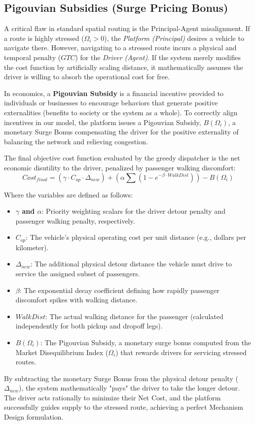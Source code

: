 \documentclass[12pt,a4paper]{article}
\begin{document}
\subsection{Pigouvian Subsidies (Surge Pricing Bonus)}
A critical flaw in standard spatial routing is the Principal-Agent misalignment. If a route is highly stressed ($\Omega_i > 0$), the \textit{Platform (Principal)} desires a vehicle to navigate there. However, navigating to a stressed route incurs a physical and temporal penalty ($GTC$) for the \textit{Driver (Agent)}. If the system merely modifies the cost function by artificially scaling distance, it mathematically assumes the driver is willing to absorb the operational cost for free.

In economics, a \textbf{Pigouvian Subsidy} is a financial incentive provided to individuals or businesses to encourage behaviors that generate positive externalities (benefits to society or the system as a whole). To correctly align incentives in our model, the platform issues a Pigouvian Subsidy, $B(\Omega_i)$, a monetary Surge Bonus compensating the driver for the positive externality of balancing the network and relieving congestion.

The final objective cost function evaluated by the greedy dispatcher is the net economic disutility to the driver, penalized by passenger walking discomfort:
\begin{equation}
    Cost_{final} = \left( \gamma \cdot C_{op} \cdot \Delta_{new} \right) + \left( \alpha \sum \left( 1 - e^{-\beta \cdot WalkDist} \right) \right) - B(\Omega_i)
\end{equation}

Where the variables are defined as follows:
\begin{itemize}
    \item \textbf{$\gamma$ and $\alpha$}: Priority weighting scalars for the driver detour penalty and passenger walking penalty, respectively.
    \item \textbf{$C_{op}$}: The vehicle's physical operating cost per unit distance (e.g., dollars per kilometer).
    \item \textbf{$\Delta_{new}$}: The additional physical detour distance the vehicle must drive to service the assigned subset of passengers.
    \item \textbf{$\beta$}: The exponential decay coefficient defining how rapidly passenger discomfort spikes with walking distance.
    \item \textbf{$WalkDist$}: The actual walking distance for the passenger (calculated independently for both pickup and dropoff legs).
    \item \textbf{$B(\Omega_i)$}: The Pigouvian Subsidy, a monetary surge bonus computed from the Market Disequilibrium Index ($\Omega_i$) that rewards drivers for servicing stressed routes.
\end{itemize}

By subtracting the monetary Surge Bonus from the physical detour penalty ($\Delta_{new}$), the system mathematically "pays" the driver to take the longer detour. The driver acts rationally to minimize their Net Cost, and the platform successfully guides supply to the stressed route, achieving a perfect Mechanism Design formulation.
\end{document}
